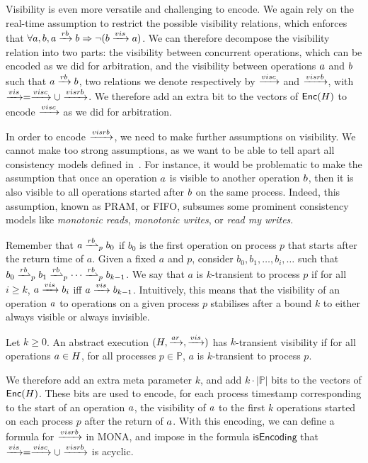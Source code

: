 Visibility is even more versatile and challenging to encode. We again rely on the real-time assumption to restrict the possible visibility relations, which enforces that $\forall a,b, a \xrightarrow{rb} b \Rightarrow \neg(b\xrightarrow{vis}a)$.
We can therefore decompose the visibility relation into two parts: the visibility between concurrent operations, which can be encoded as we did for arbitration, and the visibility between operations $a$ and $b$ such that $a\xrightarrow{rb}b$, two relations we denote respectively by $\xrightarrow{visc}$ and $\xrightarrow{visrb}$, with $\xrightarrow{vis}=\xrightarrow{visc}\cup\xrightarrow{visrb}$. We therefore add an extra bit to the vectors of $\mathsf{Enc}(H)$ to encode $\xrightarrow{visc}$ as we did for arbitration.

In order to encode $\xrightarrow{visrb}$, we need to make further assumptions on visibility. We cannot make too strong assumptions, as we want to be able to tell apart all consistency models defined in~\cite{ViottiVukolic}. For instance,
it would be problematic to make the assumption that once an operation $a$ is visible to another operation $b$, then it is also visible to all operations started after $b$ on the same process. Indeed, this assumption, known as PRAM, or FIFO, subsumes some prominent consistency models like \emph{monotonic reads}, \emph{monotonic writes}, or \emph{read my writes}.

Remember that $a\succrl{p}{rb} b_0$ if $b_0$ is the first operation on process $p$ that starts after the return time of $a$. Given a fixed $a$ and $p$, 
consider $b_0,b_1,\ldots,b_{i},\ldots$ such that $b_0\succrl{p}{rb} b_{1} \succrl{p}{rb} \cdots \succrl{p}{rb} b_{k-1}$. We say that $a$ is $k$-transient to process $p$ if for all $i\geq k$, $a\xrightarrow{vis} b_i$ iff $a\xrightarrow{vis} b_{k-1}$.
Intuitively, this means that the visibility of an operation $a$ to operations on a given process $p$ stabilises after a bound $k$ to either always visible or always invisible. 

\begin{definition}
Let $k\geq 0$. An abstract execution $(H,\xrightarrow{ar},\xrightarrow{vis})$ has $k$-transient visibility if for all operations $a\in H$, for all processes $p\in \mathbb{P}$, $a$ is $k$-transient to process $p$.
\end{definition}

We therefore add an extra meta parameter $k$, and add $k\cdot |\mathbb{P}|$ bits to the vectors of $\mathsf{Enc}(H)$. These bits are used to encode, for each process timestamp
corresponding to the start of an operation $a$, the visibility of $a$ to the first $k$ operations started on each process $p$ after the return of $a$.
With this encoding, we can define a formula for $\xrightarrow{visrb}$ in MONA, and impose in the formula $\mathsf{isEncoding}$ that $\xrightarrow{vis}=\xrightarrow{visc}\cup\xrightarrow{visrb}$ is acyclic.


